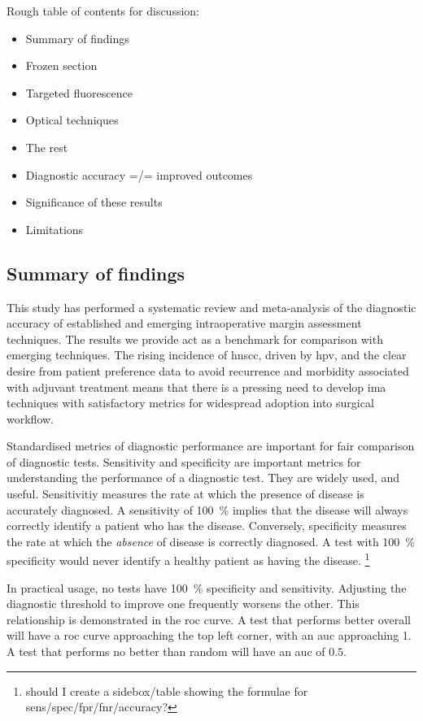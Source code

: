 Rough table of contents for discussion:
\begin{itemize}
\item Summary of findings
\item Frozen section
\item Targeted fluorescence
\item Optical techniques
\item The rest
\item Diagnostic accuracy =/= improved outcomes
\item Significance of these results
\item Limitations
\end{itemize}
 
\subsection{Summary of findings}

This study has performed a systematic review and meta-analysis of the diagnostic accuracy of established and emerging intraoperative margin assessment techniques.
The results we provide act as a benchmark for comparison with emerging techniques.
The rising incidence of \gls{hnscc}, driven by \gls{hpv}, and the clear desire from patient preference data to avoid recurrence and morbidity associated with adjuvant treatment means that there is a pressing need to develop \gls{ima} techniques with satisfactory metrics for widespread adoption into surgical workflow.

Standardised metrics of diagnostic performance are important for fair comparison of diagnostic tests.
Sensitivity and specificity are important metrics for understanding the performance of a diagnostic test.
They are widely used, and useful.
Sensitivitiy measures the rate at which the presence of disease is accurately diagnosed. 
A sensitivity of \SI{100}{\percent} implies that the disease will always correctly identify a patient who has the disease.
Conversely, specificity measures the rate at which the \emph{absence} of disease is correctly diagnosed. 
A test with \SI{100}{\percent} specificity would never identify a healthy patient as having the disease.
\footnote{should I create a sidebox/table showing the formulae for sens/spec/fpr/fnr/accuracy?}

In practical usage, no tests have \SI{100}{\percent} specificity and sensitivity.
Adjusting the diagnostic threshold to improve one frequently worsens the other.
This relationship is demonstrated in the \gls{roc} curve.
A test that performs better overall will have a \gls{roc} curve approaching the top left corner, with an \gls{auc} approaching 1.
A test that performs no better than random will have an \gls{auc} of $0.5$.

